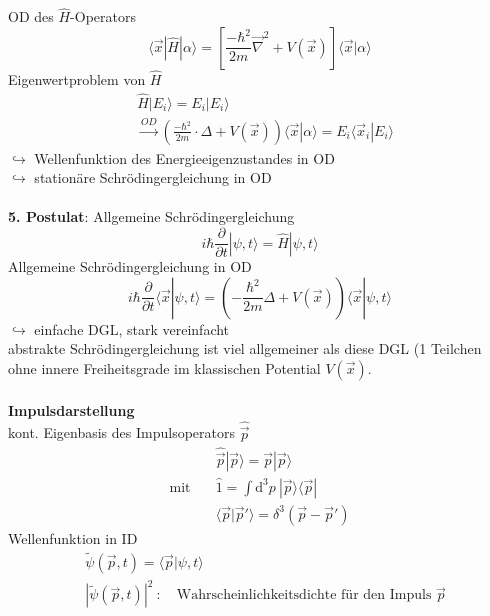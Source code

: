 \documentclass[10pt,article,colorback,accentcolor=tud9d]{scrartcl}
\begin{document}
OD des $\hat{H}$-Operators 
\begin{equation}
\langle\vec{x}|\hat{H}|\alpha\rangle=\left[\frac{-\hbar^2}{2m}\vec{\nabla}^2+V(\vec{x})\right]\langle\vec{x}|\alpha\rangle
\label{eq:Hamiltonoperator Ortsdarstellung}
\end{equation}
Eigenwertproblem von $\hat{H}$
\begin{align}
&\hat{H}|E_i\rangle=E_i|E_i\rangle\nonumber\\
&\xrightarrow{OD}\left(\frac{-\hbar^2}{2m}\cdot \Delta+V(\vec{x})\right)\langle\vec{x}|\alpha\rangle=E_i\langle\vec{x}_i|E_i\rangle
\end{align}
$\hookrightarrow$ Wellenfunktion des Energieeigenzustandes in OD\\
$\hookrightarrow$ stationäre Schrödingergleichung in OD\\\\
\textbf{5. Postulat}: Allgemeine Schrödingergleichung
\begin{equation}
i\hbar\frac{\partial}{\partial t}|\psi,t\rangle=\hat{H}|\psi,t\rangle
\label{eq:Allgemeine Schrödingergleichung}
\end{equation}
Allgemeine Schrödingergleichung in OD
\begin{equation}
i\hbar\frac{\partial}{\partial t}\langle\vec{x}|\psi,t\rangle=\left(-\frac{\hbar^2}{2m} \Delta+V(\vec{x})\right)\langle\vec{x}|\psi,t\rangle
\label{eq:Allgemeine Schrödingergleichung in OD}
\end{equation}
$\hookrightarrow$ einfache DGL, stark vereinfacht\\
abstrakte Schrödingergleichung ist viel allgemeiner als diese DGL (1 Teilchen ohne innere Freiheitsgrade im klassischen Potential $V(\vec{x})$.\\\\
\textbf{Impulsdarstellung}\\
kont. Eigenbasis des Impulsoperators $\hat{\vec{p}}$
\begin{align}
&\hat{\vec{p}}|\vec{p}\rangle=\vec{p}|\vec{p}\rangle\\
\text{mit} \quad &\hat{1}=\int \mathrm{d}^3p\ |\vec{p}\rangle\langle\vec{p}|\\
&\langle\vec{p}|\vec{p}'\rangle=\delta^3(\vec{p}-\vec{p}')
\end{align}
Wellenfunktion in ID
\begin{align}
&\tilde{\psi}(\vec{p},t)=\langle\vec{p}|\psi,t\rangle\\
&\left|\tilde{\psi}(\vec{p},t)\right|^2\ : \quad \text{Wahrscheinlichkeitsdichte für den Impuls $\vec{p}$}
\end{align}
\end{document}
